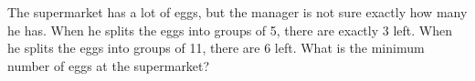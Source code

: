 \question The supermarket has a lot of eggs, but the manager is not sure exactly how many he has. When he splits the eggs into groups of 5, there are exactly 3 left. When he splits the eggs into groups of 11, there are 6 left. What is the minimum number of eggs at the supermarket?
